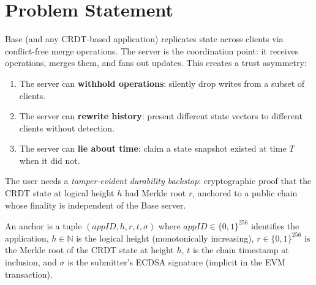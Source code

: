 \section{Problem Statement}

\label{sec:problem}

Base (and any CRDT-based application) replicates state across clients via
conflict-free merge operations. The server is the coordination point: it
receives operations, merges them, and fans out updates. This creates a
trust asymmetry:

\begin{enumerate}[nosep]
  \item The server can \textbf{withhold operations}: silently drop writes
        from a subset of clients.
  \item The server can \textbf{rewrite history}: present different state
        vectors to different clients without detection.
  \item The server can \textbf{lie about time}: claim a state snapshot
        existed at time $T$ when it did not.
\end{enumerate}

\noindent
The user needs a \emph{tamper-evident durability backstop}: cryptographic
proof that the CRDT state at logical height $h$ had Merkle root $r$,
anchored to a public chain whose finality is independent of the Base server.

\begin{definition}[Anchor]
An anchor is a tuple $(\mathit{appID}, h, r, t, \sigma)$ where
$\mathit{appID} \in \{0,1\}^{256}$ identifies the application,
$h \in \mathbb{N}$ is the logical height (monotonically increasing),
$r \in \{0,1\}^{256}$ is the Merkle root of the CRDT state at height $h$,
$t$ is the chain timestamp at inclusion, and $\sigma$ is the submitter's
ECDSA signature (implicit in the EVM transaction).
\end{definition}

